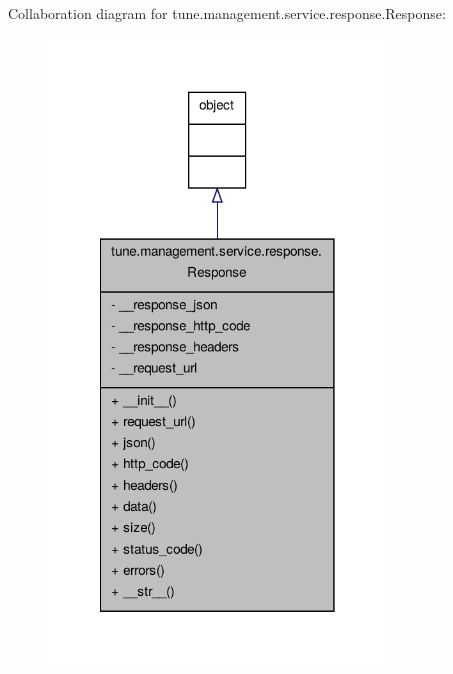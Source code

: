 Collaboration diagram for tune.\-management.\-service.\-response.\-Response\-:
\nopagebreak
\begin{figure}[H]
\begin{center}
\leavevmode
\includegraphics[width=254pt]{classtune_1_1management_1_1service_1_1response_1_1Response__coll__graph}
\end{center}
\end{figure}
